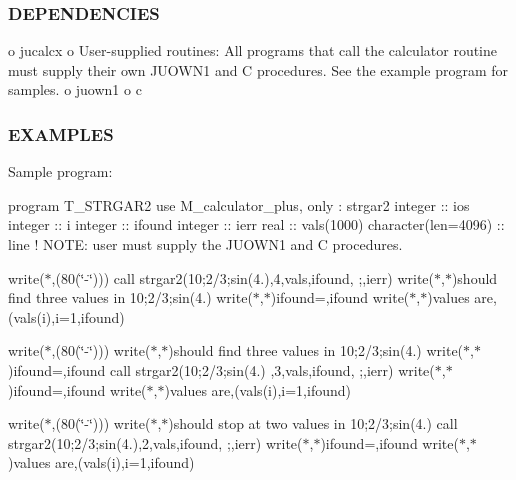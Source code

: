 \subsubsection*{D\+E\+P\+E\+N\+D\+E\+N\+C\+I\+ES}

o jucalcx o User-\/supplied routines\+: All programs that call the calculator routine must supply their own J\+U\+O\+W\+N1 and C procedures. See the example program for samples. o juown1 o c \subsubsection*{E\+X\+A\+M\+P\+L\+ES}

Sample program\+:

program T\+\_\+\+S\+T\+R\+G\+A\+R2 use M\+\_\+calculator\+\_\+plus, only \+: strgar2 integer \+:\+: ios integer \+:\+: i integer \+:\+: ifound integer \+:\+: ierr real \+:\+: vals(1000) character(len=4096) \+:\+: line ! N\+O\+TE\+: user must supply the J\+U\+O\+W\+N1 and C procedures.

write($\ast$,\textquotesingle{}(80(\char`\"{}-\/\char`\"{}))\textquotesingle{}) call strgar2(\textquotesingle{}10;2/3;sin(4.)\textquotesingle{},4,vals,ifound,\textquotesingle{} ;\textquotesingle{},ierr) write($\ast$,$\ast$)\textquotesingle{}should find three values in 10;2/3;sin(4.)\textquotesingle{} write($\ast$,$\ast$)\textquotesingle{}ifound=\textquotesingle{},ifound write($\ast$,$\ast$)\textquotesingle{}values are\textquotesingle{},(vals(i),i=1,ifound)

write($\ast$,\textquotesingle{}(80(\char`\"{}-\/\char`\"{}))\textquotesingle{}) write($\ast$,$\ast$)\textquotesingle{}should find three values in 10;2/3;sin(4.)\textquotesingle{} write($\ast$,$\ast$)\textquotesingle{}ifound=\textquotesingle{},ifound call strgar2(\textquotesingle{}10;2/3;sin(4.) \textquotesingle{},3,vals,ifound,\textquotesingle{} ;\textquotesingle{},ierr) write($\ast$,$\ast$)\textquotesingle{}ifound=\textquotesingle{},ifound write($\ast$,$\ast$)\textquotesingle{}values are\textquotesingle{},(vals(i),i=1,ifound)

write($\ast$,\textquotesingle{}(80(\char`\"{}-\/\char`\"{}))\textquotesingle{}) write($\ast$,$\ast$)\textquotesingle{}should stop at two values in 10;2/3;sin(4.)\textquotesingle{} call strgar2(\textquotesingle{}10;2/3;sin(4.)\textquotesingle{},2,vals,ifound,\textquotesingle{} ;\textquotesingle{},ierr) write($\ast$,$\ast$)\textquotesingle{}ifound=\textquotesingle{},ifound write($\ast$,$\ast$)\textquotesingle{}values are\textquotesingle{},(vals(i),i=1,ifound)

